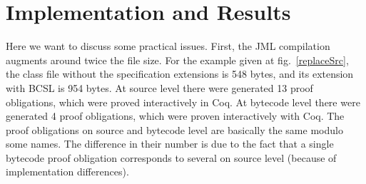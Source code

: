 \section{Implementation and Results}\label{results}

Here we want to discuss some practical issues. First, the JML compilation augments around twice the file size. For the example given at fig.~\ref{replaceSrc}, the class file without the specification extensions is 548 bytes, and its extension with BCSL is 954 bytes. At source level there were generated 13 proof obligations, which were proved interactively in Coq. At bytecode level there were generated 4 proof obligations, which were proven interactively with Coq. The proof obligations on source and bytecode level are basically the same modulo some names. The difference in their number is due to the fact that a single bytecode proof obligation corresponds to several on source level (because of implementation differences).    
